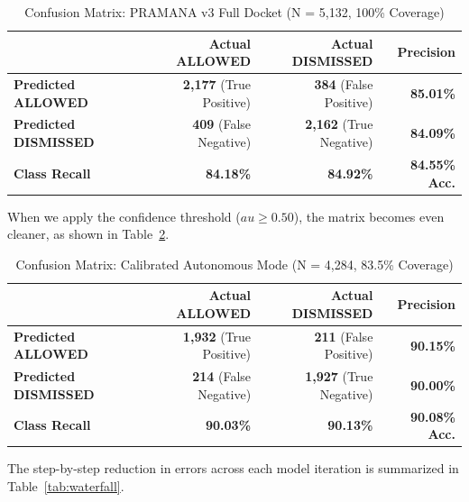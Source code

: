 \documentclass[11pt,a4paper]{article}
\begin{document}
\begin{table}[h]
\caption{Confusion Matrix: PRAMANA v3 Full Docket (N = 5,132, 100\% Coverage)}
\label{tab:cm_full}
\centering
\begin{tabular}{lrrr}
\toprule
& \textbf{Actual ALLOWED} & \textbf{Actual DISMISSED} & \textbf{Precision} \\
\midrule
\textbf{Predicted ALLOWED} & \textbf{2,177} (True Positive) & \textbf{384} (False Positive) & \textbf{85.01\%} \\
\textbf{Predicted DISMISSED} & \textbf{409} (False Negative) & \textbf{2,162} (True Negative) & \textbf{84.09\%} \\
\midrule
\textbf{Class Recall} & \textbf{84.18\%} & \textbf{84.92\%} & \textbf{84.55\% Acc.} \\
\bottomrule
\end{tabular}
\end{table}

When we apply the confidence threshold ($	au \ge 0.50$), the matrix becomes even cleaner, as shown in Table~\ref{tab:cm_calib}.

\begin{table}[h]
\caption{Confusion Matrix: Calibrated Autonomous Mode (N = 4,284, 83.5\% Coverage)}
\label{tab:cm_calib}
\centering
\begin{tabular}{lrrr}
\toprule
& \textbf{Actual ALLOWED} & \textbf{Actual DISMISSED} & \textbf{Precision} \\
\midrule
\textbf{Predicted ALLOWED} & \textbf{1,932} (True Positive) & \textbf{211} (False Positive) & \textbf{90.15\%} \\
\textbf{Predicted DISMISSED} & \textbf{214} (False Negative) & \textbf{1,927} (True Negative) & \textbf{90.00\%} \\
\midrule
\textbf{Class Recall} & \textbf{90.03\%} & \textbf{90.13\%} & \textbf{90.08\% Acc.} \\
\bottomrule
\end{tabular}
\end{table}

The step-by-step reduction in errors across each model iteration is summarized in Table~\ref{tab:waterfall}.
\end{document}
